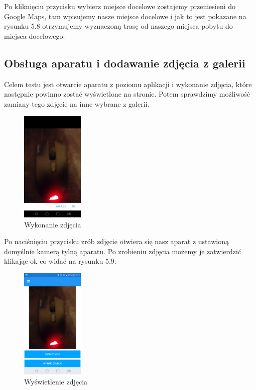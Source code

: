 Po kliknięciu przycisku wybierz miejsce docelowe zostajemy przeniesieni do Google Maps, tam wpisujemy nasze miejsce docelowe i jak to jest pokazane na rysunku 5.8 otrzymujemy wyznaczoną trasę od naszego miejsca pobytu do miejsca docelowego.

\subsection{Obsługa aparatu i dodawanie zdjęcia z galerii}

Celem testu jest otwarcie aparatu z poziomu aplikacji i wykonanie zdjęcia, które następnie powinno zostać wyświetlone na stronie. Potem sprawdzimy możliwość zamiany tego zdjęcie na inne wybrane z galerii.

\begin{figure}[!htb]
	\begin{center}
		\includegraphics[width=3cm]{rys/ZZfoto.png}
		\caption{Wykonanie zdjęcia}
		\label{rys:rysunek037}
	\end{center}
\end{figure}

Po naciśnięciu przycisku zrób zdjęcie otwiera się nasz aparat z ustawioną domyślnie kamerą tylną aparatu. Po zrobieniu zdjęcia możemy je zatwierdzić klikając ok co widać na rysunku 5.9.

\begin{figure}[!htb]
	\begin{center}
		\includegraphics[width=3cm]{rys/ZZfoto2.png}
		\caption{Wyświetlenie zdjęcia}
		\label{rys:rysunek038}
	\end{center}
\end{figure}

